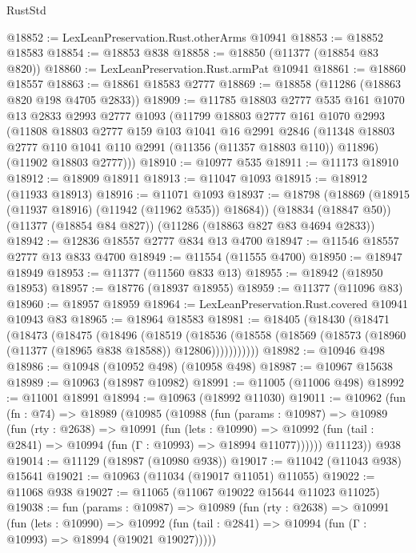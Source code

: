 \begin{lexlean}{RustStd}
\begin{coremodule}
@18852 := LexLeanPreservation.Rust.otherArms @10941
@18853 := @18852 @18583
@18854 := @18853 @838
@18858 := @18850 (@11377 (@18854 @83 @820))
@18860 := LexLeanPreservation.Rust.armPat @10941
@18861 := @18860 @18557
@18863 := @18861 @18583 @2777
@18869 := @18858 (@11286 (@18863 @820 @198 @4705 @2833))
@18909 := @11785
    @18803
    @2777
    @535
    @161
    @1070
    @13
    @2833
    @2993
    @2777
    @1093
    (@11799
      @18803
      @2777
      @161
      @1070
      @2993
      (@11808
        @18803
        @2777
        @159
        @103
        @1041
        @16
        @2991
        @2846
        (@11348 @18803 @2777 @110 @1041 @110 @2991 (@11356 (@11357 @18803 @110)) @11896)
        (@11902 @18803 @2777)))
@18910 := @10977 @535
@18911 := @11173 @18910
@18912 := @18909 @18911
@18913 := @11047 @1093
@18915 := @18912 (@11933 @18913)
@18916 := @11071 @1093
@18937 := @18798
    (@18869 (@18915 (@11937 @18916) (@11942 (@11962 @535)) @18684))
    (@18834 (@18847 @50))
    (@11377 (@18854 @84 @827))
    (@11286 (@18863 @827 @83 @4694 @2833))
@18942 := @12836 @18557 @2777 @834 @13 @4700
@18947 := @11546 @18557 @2777 @13 @833 @4700
@18949 := @11554 (@11555 @4700)
@18950 := @18947 @18949
@18953 := @11377 (@11560 @833 @13)
@18955 := @18942 (@18950 @18953)
@18957 := @18776 (@18937 @18955)
@18959 := @11377 (@11096 @83)
@18960 := @18957 @18959
@18964 := LexLeanPreservation.Rust.covered @10941 @10943 @83
@18965 := @18964 @18583
@18981 := @18405
    (@18430
      (@18471
        (@18473
          (@18475
            (@18496
              (@18519
                (@18536
                  (@18558 (@18569 (@18573 (@18960 (@11377 (@18965 @838 @18588)) @12806)))))))))))
@18982 := @10946 @498
@18986 := @10948 (@10952 @498) (@10958 @498)
@18987 := @10967 @15638
@18989 := @10963 (@18987 @10982)
@18991 := @11005 (@11006 @498)
@18992 := @11001 @18991
@18994 := @10963 (@18992 @11030)
@19011 := @10962
    (fun (fn : @74) =>
    @18989
      (@10985
        (@10988
          (fun (params : @10987) =>
          @10989
            (fun (rty : @2638) =>
            @10991
              (fun (lets : @10990) =>
              @10992 (fun (tail : @2841) => @10994 (fun (Γ : @10993) => @18994 @11077))))))
        @11123))
    @938
@19014 := @11129 (@18987 (@10980 @938))
@19017 := @11042 (@11043 @938) @15641
@19021 := @10963 (@11034 (@19017 @11051) @11055)
@19022 := @11068 @938
@19027 := @11065 (@11067 @19022 @15644 @11023 @11025)
@19038 := fun (params : @10987) =>
  @10989
    (fun (rty : @2638) =>
    @10991
      (fun (lets : @10990) =>
      @10992 (fun (tail : @2841) => @10994 (fun (Γ : @10993) => @18994 (@19021 @19027)))))

\end{coremodule}
\end{lexlean}
